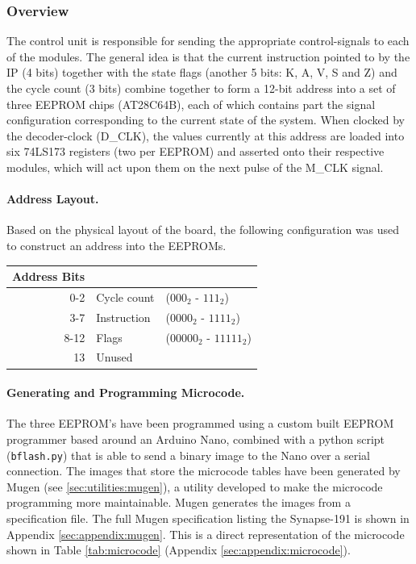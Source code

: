\subsubsection{Overview}
The control unit is responsible for sending the appropriate control-signals to each of the modules. The general idea is that the current instruction pointed to by the IP (4 bits) together with the state flags (another 5 bits: K, A, V, S and Z) and the cycle count (3 bits) combine together to form a 12-bit address into a set of three EEPROM chips (AT28C64B), each of which contains part the signal configuration corresponding to the current state of the system. When clocked by the decoder-clock (D\_CLK), the values currently at this address are loaded into six 74LS173 registers (two per EEPROM) and asserted onto their respective modules, which will act upon them on the next pulse of the M\_CLK signal.

\paragraph{Address Layout.} Based on the physical layout of the board, the following configuration was used to construct an address into the EEPROMs.
\\
\begin{center}
\begin{tabular}{r|ll} 
  Address Bits & \\ \hline
  0-2  & Cycle count & ($000_2$ - $111_2$) \\
  3-7  & Instruction & ($0000_2$ - $1111_2$) \\
  8-12 & Flags  & ($00000_2$ - $11111_2$) \\
  13   & Unused & 
\end{tabular}
\end{center}


\paragraph{Generating and Programming Microcode.} The three EEPROM's have been programmed using a custom built EEPROM programmer based around an Arduino Nano, combined with a python script (\texttt{bflash.py}) that is able to send a binary image to the Nano over a serial connection. The images that store the microcode tables have been generated by Mugen (see \ref{sec:utilities:mugen}), a utility developed to make the microcode programming more maintainable. Mugen generates the images from a specification file. The full Mugen specification listing the Synapse-191 is shown in Appendix \ref{sec:appendix:mugen}. This is a direct representation of the microcode shown in Table \ref{tab:microcode} (Appendix \ref{sec:appendix:microcode}).



